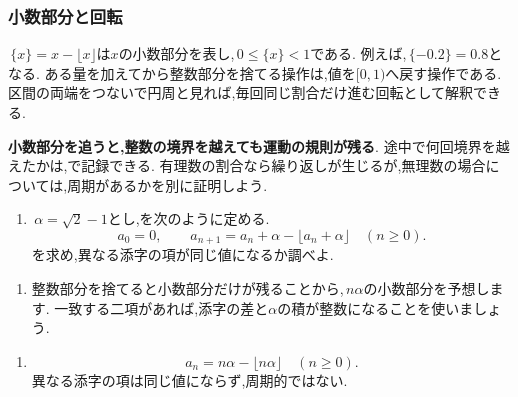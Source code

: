   \subsubsection{小数部分と回転}\label{節：ガウス型の小数部分と回転}
    \,$\{x\}=x-\lfloor x\rfloor$は$x$の小数部分を表し,\,$0\le\{x\}<1$である.
    例えば,\,$\{-0.2\}=0.8$となる.
    ある量を加えてから整数部分を捨てる操作は,値を$[0,1)$へ戻す操作である.
    区間の両端をつないで円周と見れば,毎回同じ割合だけ進む回転として解釈できる.

    \textbf{小数部分を追うと,整数の境界を越えても運動の規則が残る}.
    途中で何回境界を越えたかは,で記録できる.
    有理数の割合なら繰り返しが生じるが,無理数の場合については,周期があるかを別に証明しよう.

    \noindent {}\par\nobreak
    \begin{enumerate}[label=(\arabic*),parsep=3pt,beginpenalty=10000,format=\bookitemlink{example-gauss-role-9}{problem}{answer}]
      \item \,$\alpha=\sqrt2-1$とし,を次のように定める.
            \[
              a_0=0,\qquad
              a_{n+1}=a_n+\alpha-\lfloor a_n+\alpha\rfloor
              \quad(n\ge0).
            \]
            を求め,異なる添字の項が同じ値になるか調べよ.
    \end{enumerate}

    \noindent {}\par\nobreak
    \begin{enumerate}[label=(\arabic*),parsep=3pt,beginpenalty=10000,format=\bookitemlink{example-gauss-role-9}{hint}{problem}]
      \item 整数部分を捨てると小数部分だけが残ることから,\,$n\alpha$の小数部分を予想します.
            一致する二項があれば,添字の差と$\alpha$の積が整数になることを使いましょう.
    \end{enumerate}

    \noindent {}\par\nobreak
    \begin{enumerate}[label=(\arabic*),parsep=3pt,beginpenalty=10000,format=\bookitemlink{example-gauss-role-9}{answer}{problem}]
      \item \[
              a_n=n\alpha-\lfloor n\alpha\rfloor\quad(n\ge0).
            \]
            異なる添字の項は同じ値にならず,周期的ではない.
    \end{enumerate}

